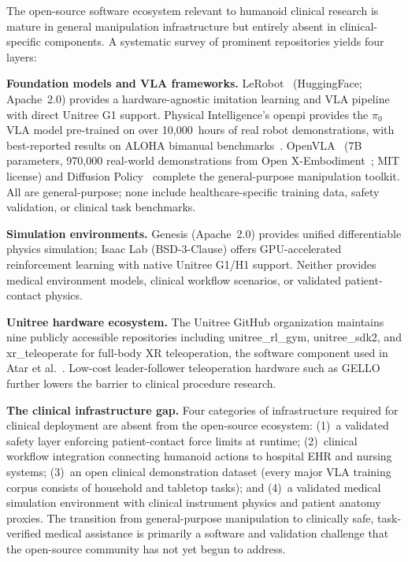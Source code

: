\documentclass[acmjour]{acmart}
\begin{document}
The open-source software ecosystem relevant to humanoid clinical research is
mature in general manipulation infrastructure but entirely absent in clinical-specific
components. A systematic survey of prominent repositories yields four layers:

\textbf{Foundation models and VLA frameworks.} LeRobot~\cite{cadene2024lerobot}
(HuggingFace; Apache~2.0) provides a hardware-agnostic imitation
learning and VLA pipeline with direct Unitree G1 support. Physical Intelligence's
openpi provides the $\pi_0$~\cite{black2024pi0} VLA model pre-trained on over
10,000~hours of real robot demonstrations, with best-reported results on ALOHA
bimanual benchmarks~\cite{zhao2023act}. OpenVLA~\cite{kim2024openvla} (7B parameters,
970,000 real-world demonstrations from Open X-Embodiment~\cite{openxembodiment2023};
MIT license) and Diffusion Policy~\cite{chi2023diffusion} complete the general-purpose
manipulation toolkit. All are general-purpose; none include healthcare-specific
training data, safety validation, or clinical task benchmarks.

\textbf{Simulation environments.} Genesis (Apache~2.0) provides
unified differentiable physics simulation; Isaac Lab (BSD-3-Clause)
offers GPU-accelerated reinforcement learning with native Unitree G1/H1 support.
Neither provides medical environment models, clinical workflow scenarios, or
validated patient-contact physics.

\textbf{Unitree hardware ecosystem.} The Unitree GitHub organization maintains
nine publicly accessible repositories including unitree\_rl\_gym,
unitree\_sdk2, and xr\_teleoperate for full-body
XR teleoperation, the software component used in Atar et al.~\cite{atar2025humanoids}.
Low-cost leader-follower teleoperation hardware such as GELLO~\cite{wu2023gello}
further lowers the barrier to clinical procedure research.

\textbf{The clinical infrastructure gap.} Four categories of infrastructure
required for clinical deployment are absent from the open-source ecosystem:
(1)~a validated safety layer enforcing patient-contact force limits at runtime;
(2)~clinical workflow integration connecting humanoid actions to hospital EHR
and nursing systems; (3)~an open clinical demonstration dataset (every major
VLA training corpus consists of household and tabletop tasks); and (4)~a validated
medical simulation environment with clinical instrument physics and patient
anatomy proxies. The transition from general-purpose manipulation to clinically
safe, task-verified medical assistance is primarily a software and validation
challenge that the open-source community has not yet begun to address.
\end{document}
